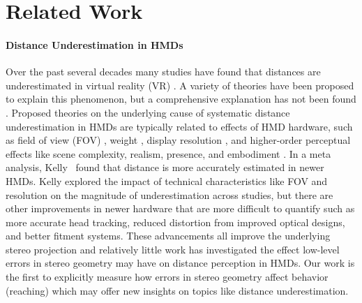 \section{Related Work}
\label{sec:related_work}

\paragraph{Distance Underestimation in HMDs}
Over the past several decades many studies have found that distances are underestimated in virtual reality (VR) \cite{creem-regehr_chapter_2015, el_jamiy_distance_2019, el_jamiy_survey_2019, renner_perception_2013}. A variety of theories have been proposed to explain this phenomenon, but a comprehensive explanation has not been found \cite{creem2023perceiving}. Proposed theories on the underlying cause of systematic distance underestimation in HMDs are typically related to effects of HMD hardware, such as field of view (FOV) \cite{kline_distance_1996,buck_comparison_2018}, weight \cite{willemsen_effects_2009,buck_comparison_2018,masnadi_field_2021,masnadi_effects_2022}, display resolution \cite{thompson_does_2004,kelly2022distance,ryu_influence_2005}, and higher-order perceptual effects like scene complexity, realism, presence, and embodiment \cite{el_jamiy_distance_2020,bodenheimer_perceiving_2023,vaziri_impact_2017, gonzalez2019individual}. In a meta analysis, Kelly~ found that distance is more accurately estimated in newer HMDs. Kelly explored the impact of technical characteristics like FOV and resolution on the magnitude of underestimation across studies, but there are other improvements in newer hardware that are more difficult to quantify such as more accurate head tracking, reduced distortion from improved optical designs, and better fitment systems. These advancements all improve the underlying stereo projection and relatively little work has investigated the effect low-level errors in stereo geometry may have on distance perception in HMDs. Our work is the first to explicitly measure how errors in stereo geometry affect behavior (reaching) which may offer new insights on topics like distance underestimation.

